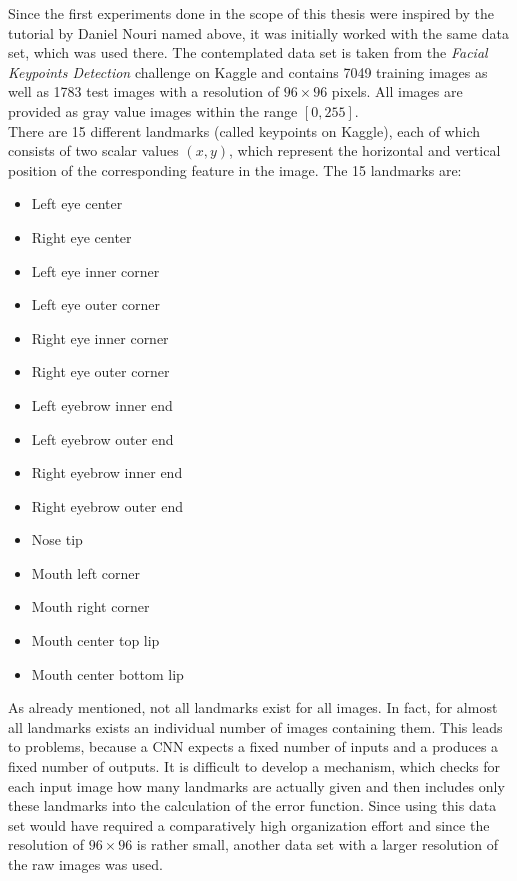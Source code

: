 \documentclass[11pt, a4paper]{article}
\begin{document}
Since the first experiments done in the scope of this thesis were inspired by the tutorial by Daniel Nouri named above, it was initially worked with the same data set, which was used there. The contemplated data set is taken from the \emph{Facial Keypoints Detection} challenge on Kaggle and contains 7049 training images as well as 1783 test images with a resolution of $96 \times 96$ pixels. All images are provided as gray value images within the range $[0,255]$.\\
There are 15 different landmarks (called keypoints on Kaggle), each of which consists of two scalar values $(x,y)$, which represent the horizontal and vertical position of the corresponding feature in the image. The 15 landmarks are:
\begin{multicols}{2}
	\begin{itemize}[itemsep=-2ex]
		\item Left eye center
		\item Right eye center
		\item Left eye inner corner
		\item Left eye outer corner
		\item Right eye inner corner
		\item Right eye outer corner
		\item Left eyebrow inner end
		\item Left eyebrow outer end
	\end{itemize}
\columnbreak
	\begin{itemize}[itemsep=-2ex]
		\item Right eyebrow inner end
		\item Right eyebrow outer end
		\item Nose tip
		\item Mouth left corner
		\item Mouth right corner
		\item Mouth center top lip
		\item Mouth center bottom lip
	\end{itemize}
	\vphantom{}
\end{multicols}
As already mentioned, not all landmarks exist for all images. In fact, for almost all landmarks exists an individual number of images containing them. This leads to problems, because a \ac{CNN} expects a fixed number of inputs and a produces a fixed number of outputs. It is difficult to develop a mechanism, which checks for each input image how many landmarks are actually given and then includes only these landmarks into the calculation of the error function. Since using this data set would have required a comparatively high organization effort and since the resolution of $96 \times 96$ is rather small, another data set with a larger resolution of the raw images was used.
\end{document}
